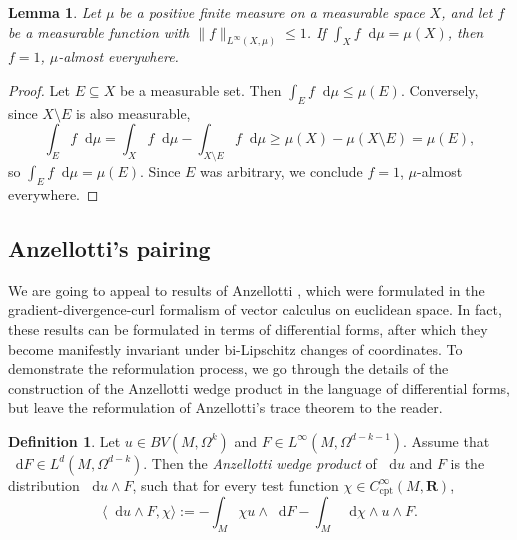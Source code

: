 \documentclass[reqno,11pt]{amsart}
\newcommand{\RR}{\mathbf{R}}
\newcommand*\dif{\mathop{}\!\mathrm{d}}
\newcommand{\dfn}[1]{\emph{#1}\index{#1}}
\newcommand{\cpt}{\mathrm{cpt}}
\newtheorem{lemma}[theorem]{Lemma}
\theoremstyle{definition}
\newtheorem{definition}[theorem]{Definition}
\numberwithin{equation}{section}
\begin{document}
\begin{lemma}\label{measurable function is 1}
Let $\mu$ be a positive finite measure on a measurable space $X$, and let $f$ be a measurable function with $\|f\|_{L^\infty(X, \mu)} \leq 1$.
If $\int_X f \dif \mu = \mu(X)$, then $f = 1$, $\mu$-almost everywhere.
\end{lemma}
\begin{proof}
Let $E \subseteq X$ be a measurable set.
Then $\int_E f \dif \mu \leq \mu(E)$.
Conversely, since $X \setminus E$ is also measurable,
$$\int_E f \dif \mu = \int_X f \dif \mu - \int_{X \setminus E} f \dif \mu \geq \mu(X) - \mu(X \setminus E) = \mu(E),$$
so $\int_E f \dif \mu = \mu(E)$.
Since $E$ was arbitrary, we conclude $f = 1$, $\mu$-almost everywhere.
\end{proof}

\subsection{Anzellotti's pairing}
We are going to appeal to results of Anzellotti \cite{Anzellotti1983}, which were formulated in the gradient-divergence-curl formalism of vector calculus on euclidean space.
In fact, these results can be formulated in terms of differential forms, after which they become manifestly invariant under bi-Lipschitz changes of coordinates.
To demonstrate the reformulation process, we go through the details of the construction of the Anzellotti wedge product in the language of differential forms, but leave the reformulation of Anzellotti's trace theorem to the reader.

\begin{definition}
Let $u \in BV(M, \Omega^k)$ and $F \in L^\infty(M, \Omega^{d - k - 1})$.
Assume that $\dif F \in L^d(M, \Omega^{d - k})$.
Then the \dfn{Anzellotti wedge product} of $\dif u$ and $F$ is the distribution $\dif u \wedge F$, such that for every test function $\chi \in C^\infty_\cpt(M, \RR)$,
$$\langle \dif u \wedge F, \chi\rangle := -\int_M \chi u \wedge \dif F - \int_M \dif \chi \wedge u \wedge F.$$
\end{definition}
\end{document}
